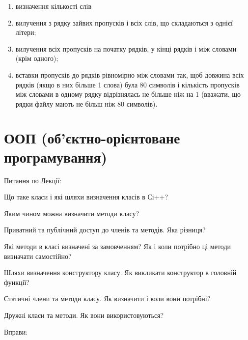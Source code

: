 \documentclass[]{article}
\makeatletter
\newcommand{\xslalph}[1]{\expandafter\@xslalph\csname c@#1\endcsname}
\newcommand{\@xslalph}[1]{%
    \ifcase#1\or а\or б\or в\or г\or д\or e\or є\or ж\or з\or i%
    \or й\or к\or л\or м\or н\or о\or п\or р\or с\or т%
    \or у\or ф\or х\or ц\or ч\or ш\or ю\or я\or аа\or бб\or вв %
    \else\@ctrerr\fi%
}
\makeatother
\begin{document}
\begin{enumerate}
\begin{enumerate}[label=\xslalph*)]
\item визначення кількості слів
\item вилучення з рядку зайвих пропусків і всіх слів, що складаються з
однієї літери;
\item вилучення всіх пропусків на початку рядків, у кінці рядків і між
словами (крім одного);
\item вставки пропусків до рядків рівномірно між словами так, щоб довжина
всіх рядків (якщо в них більше 1 слова) була 80 символів і 
кількість пропусків між словами в одному рядку відрізнялась не більше ніж на 1 
(вважати, що рядки файлу мають не більш ніж 80 символів).

\end{enumerate}

\end{enumerate}


\section { ООП (об'єктно-орієнтоване програмування)}


Питання по Лекції:

Що таке класи і які шляхи визначення класів в Сі++?

Яким чином можна визначити методи класу?

Приватний та публічний доступ до членів та методів. Яка різниця?

Які методи в класі визначені за замовченням? Як і коли потрібно ці
методи визначати самостійно?

Шляхи визначення конструктору класу. Як викликати конструктор в головній
функції?

Статичні члени та методи класу. Як визначити і коли вони потрібні?

Дружні класи та методи. Як вони використовуються?

Вправи:
\end{document}

